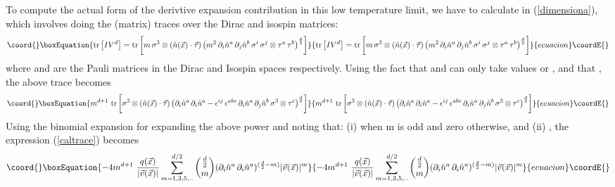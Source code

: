 \documentclass[a4paper,prd]{revtex4}
\begin{document}
To compute the actual form of the derivtive expansion contribution in this
low temperature limit, we  have to calculate
\coordHE{} in (\ref{dimensiona}), which
involves doing the (matrix) traces over the Dirac and isospin matrices:
\begin{equation}\coord{}\boxEquation{
\textrm{tr}\left[I V^{d}\right]= \textrm{tr}\left[m\,
\sigma^{3}\otimes \left(\hat{n}(\vec{x})\cdot 
\vec{\tau}\right)\left(m^2\,  \partial_{i}\hat{n}^a
\,\partial_{j}\hat{n}^b\, \sigma^{i}\, \sigma^{j} \otimes \tau^{a}\,
\tau^{b}\right)^{\frac{d}{2}}\right]
}{
\textrm{tr}\left[I V^{d}\right]= \textrm{tr}\left[m\,
\sigma^{3}\otimes \left(\hat{n}(\vec{x})\cdot 
\vec{\tau}\right)\left(m^2\,  \partial_{i}\hat{n}^a
\,\partial_{j}\hat{n}^b\, \sigma^{i}\, \sigma^{j} \otimes \tau^{a}\,
\tau^{b}\right)^{\frac{d}{2}}\right]
}{ecuacion}\coordE{}\end{equation}
where \coordHE{} and \myHighlight{$\vec{\tau}$}\coordHE{} are the Pauli matrices in 
the Dirac and Isospin spaces respectively. Using the fact that \coordHE{} and \coordHE{} can only
take values \coordHE{} or \coordHE{}, and that \coordHE{}, the above trace becomes
\begin{equation}\coord{}\boxEquation{
m^{d+1}\textrm{ tr}\left[\sigma^{3} \otimes
(\hat{n}(\vec{x})\cdot\vec{\tau})\left(\partial_{i}\hat{n}^{a}\,
\partial_{i}\hat{n}^{a}-\epsilon^{ij}\,\epsilon^{abc}\, \partial_{i}\hat{n}^a\,
\partial_{j}\hat{n}^b\, \sigma^{3} \otimes \tau^{c}\right)^{\frac{d}{2}}\right]
\label{caltrace}
}{
m^{d+1}\textrm{ tr}\left[\sigma^{3} \otimes
(\hat{n}(\vec{x})\cdot\vec{\tau})\left(\partial_{i}\hat{n}^{a}\,
\partial_{i}\hat{n}^{a}-\epsilon^{ij}\,\epsilon^{abc}\, \partial_{i}\hat{n}^a\,
\partial_{j}\hat{n}^b\, \sigma^{3} \otimes \tau^{c}\right)^{\frac{d}{2}}\right]
}{ecuacion}\coordE{}\end{equation}
Using the binomial expansion for expanding the above power and noting
that:  (i) \coordHE{} when m is odd and zero
otherwise, and (ii)
\coordHE{}, the expression (\ref{caltrace})
becomes
\begin{equation}\coord{}\boxEquation{
-4 m^{d+1} \, \, \frac{q(\vec{x})}{|\vec{v}(\vec{x})|} \sum_{m=1, 3, 5, . . }^{d/2} 
{\frac{d}{2} \choose m}(\partial_{i}\hat{n}^{a}\,
\partial_{i}\hat{n}^{a})^{(\frac{d}{2} -m)} |\vec{v}(\vec{x})|^{m}
}{
-4 m^{d+1} \, \, \frac{q(\vec{x})}{|\vec{v}(\vec{x})|} \sum_{m=1, 3, 5, . . }^{d/2} 
{\frac{d}{2} \choose m}(\partial_{i}\hat{n}^{a}\,
\partial_{i}\hat{n}^{a})^{(\frac{d}{2} -m)} |\vec{v}(\vec{x})|^{m}
}{ecuacion}\coordE{}\end{equation}
\end{document}
